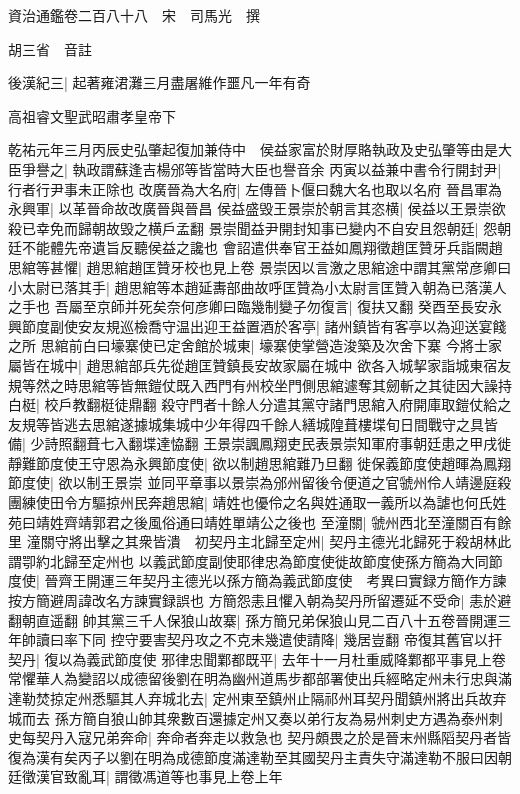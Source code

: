資治通鑑卷二百八十八　宋　司馬光　撰

胡三省　音註

後漢紀三|{
	起著雍涒灘三月盡屠維作噩凡一年有奇}


高祖睿文聖武昭肅孝皇帝下

乾祐元年三月丙辰史弘肇起復加兼侍中　侯益家富於財厚賂執政及史弘肇等由是大臣爭譽之|{
	執政謂蘇逢吉楊邠等皆當時大臣也譽音余}
丙寅以益兼中書令行開封尹|{
	行者行尹事未正除也}
改廣晉為大名府|{
	左傳晉卜偃曰魏大名也取以名府}
晉昌軍為永興軍|{
	以革晉命故改廣晉與晉昌}
侯益盛毁王景崇於朝言其恣横|{
	侯益以王景崇欲殺已幸免而歸朝故毁之横戶孟翻}
景崇聞益尹開封知事已變内不自安且怨朝廷|{
	怨朝廷不能體先帝遺旨反聽侯益之讒也}
會詔遣供奉官王益如鳳翔徵趙匡贊牙兵詣闕趙思綰等甚懼|{
	趙思綰趙匡贊牙校也見上卷}
景崇因以言激之思綰途中謂其黨常彦卿曰小太尉已落其手|{
	趙思綰等本趙延夀部曲故呼匡贊為小太尉言匡贊入朝為已落漢人之手也}
吾屬至京師并死矣奈何彦卿曰臨幾制變子勿復言|{
	復扶又翻}
癸酉至長安永興節度副使安友規巡檢喬守温出迎王益置酒於客亭|{
	諸州鎮皆有客亭以為迎送宴餞之所}
思綰前白曰壕寨使已定舍館於城東|{
	壕寨使掌營造浚築及次舍下寨}
今將士家屬皆在城中|{
	趙思綰部兵先從趙匡贊鎮長安故家屬在城中}
欲各入城挈家詣城東宿友規等然之時思綰等皆無鎧仗既入西門有州校坐門側思綰遽奪其劒斬之其徒因大譟持白梃|{
	校戶教翻梃徒鼎翻}
殺守門者十餘人分遣其黨守諸門思綰入府開庫取鎧仗給之友規等皆逃去思綰遂據城集城中少年得四千餘人繕城隍葺樓堞旬日間戰守之具皆備|{
	少詩照翻葺七入翻堞達恊翻}
王景崇諷鳳翔吏民表景崇知軍府事朝廷患之甲戌徙靜難節度使王守恩為永興節度使|{
	欲以制趙思綰難乃旦翻}
徙保義節度使趙暉為鳳翔節度使|{
	欲以制王景崇}
並同平章事以景崇為邠州留後令便道之官虢州伶人靖邊庭殺團練使田令方驅掠州民奔趙思綰|{
	靖姓也優伶之名與姓通取一義所以為謔也何氏姓苑曰靖姓齊靖郭君之後風俗通曰靖姓單靖公之後也}
至潼關|{
	虢州西北至潼關百有餘里}
潼關守將出擊之其衆皆潰　初契丹主北歸至定州|{
	契丹主德光北歸死于殺胡林此謂卾約北歸至定州也}
以義武節度副使耶律忠為節度使徙故節度使孫方簡為大同節度使|{
	晉齊王開運三年契丹主德光以孫方簡為義武節度使　考異曰實録方簡作方諫按方簡避周諱改名方諫實録誤也}
方簡怨恚且懼入朝為契丹所留遷延不受命|{
	恚於避翻朝直遥翻}
帥其黨三千人保狼山故寨|{
	孫方簡兄弟保狼山見二百八十五卷晉開運三年帥讀曰率下同}
控守要害契丹攻之不克未幾遣使請降|{
	幾居豈翻}
帝復其舊官以扞契丹|{
	復以為義武節度使}
邪律忠聞鄴都既平|{
	去年十一月杜重威降鄴都平事見上卷}
常懼華人為變詔以成德留後劉在明為幽州道馬步都部署使出兵經略定州未行忠與滿達勒焚掠定州悉驅其人弃城北去|{
	定州東至鎮州止隔祁州耳契丹聞鎮州將出兵故弃城而去}
孫方簡自狼山帥其衆數百還據定州又奏以弟行友為易州刺史方遇為泰州刺史每契丹入寇兄弟奔命|{
	奔命者奔走以救急也}
契丹頗畏之於是晉末州縣䧟契丹者皆復為漢有矣丙子以劉在明為成德節度滿達勒至其國契丹主責失守滿達勒不服曰因朝廷徵漢官致亂耳|{
	謂徵馮道等也事見上卷上年}

